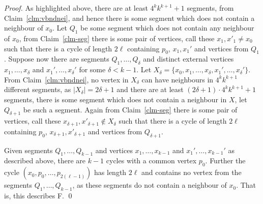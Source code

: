 \documentclass[10pt,a4paper]{amsart}
\newcommand{\forbiddenGraph}{F}
\begin{document}
\begin{proof}
    As highlighted above, there are at least $4^kk^{k+1}+1$ segments, from Claim~\ref{clm:vbndnei}, and hence there is some segment which does not contain a neighbour of $x_0$. Let $Q_1$ be some segment which does not contain any neighbour of $x_0$, from Claim~\ref{clm-seg} there is some pair of vertices, call these $x_1, x'_1 \neq x_0$ such that there is a cycle of length $2\ell$ containing $p_0$, $x_1, x_1'$ and vertices from $Q_1$.
    Suppose now there are segments $Q_1,\dots, Q_{\delta}$ and distinct external vertices $x_1, \dots, x_{\delta}$ and $x_1',\dots, x_{\delta}'$ for some $\delta < k-1$. Let $X_{\delta} = \{x_0,x_1, \dots, x_{\delta}, x_1',\dots, x_{\delta}'\}$. From Claim~\ref{clm:vbndnei}, no vertex in $X_{\delta}$ can have neighbours in $4^kk^{k+1}$ different segments, as $|X_{\delta}| = 2\delta+1$ and there are at least $(2\delta+1) \cdot 4^kk^{k+1}+1$ segments, there is some segment which does not contain a neighbour in $X$, let $Q_{\delta+1}$ be such a segment. Again from Claim~\ref{clm-seg} there is some pair of vertices, call these $x_{\delta+1}, x'_{\delta+1} \notin X_{\delta}$ such that there is a cycle of length $2\ell$ containing $p_0$, $x_{\delta+1}, x'_{\delta+1}$ and vertices from $Q_{\delta+1}$.

    Given segments $Q_1,\dots, Q_{k-1}$ and vertices $x_1, \dots, x_{k-1}$ and $x_1',\dots, x_{k-1}'$ as described above, there are $k-1$ cycles with a common vertex $p_0$. Further the cycle $(x_0, p_0, \ldots, p_{2(\ell-1)})$ has length $2\ell$ and contains no vertex from the segments $Q_1,\dots, Q_{k-1}$, as these segments do not contain a neighbour of $x_0$. That is, this describes \forbiddenGraph. \qed
\end{proof}
\end{document}
